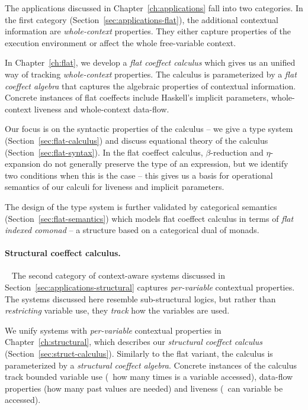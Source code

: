 The applications discussed in Chapter~\ref{ch:applications} fall into two categories. In the first
category (Section~\ref{sec:applications-flat}), the additional contextual information are 
\emph{whole-context} properties. They either capture properties of the execution environment or
affect the whole free-variable context.

In Chapter~\ref{ch:flat}, we develop a \emph{flat coeffect calculus} which gives us an unified way
of tracking \emph{whole-context} properties. The calculus is parameterized by a \emph{flat coeffect
algebra} that captures the algebraic properties of contextual information. Concrete 
instances of flat coeffects include Haskell's implicit parameters, whole-context liveness and
whole-context data-flow. 

Our focus is on the syntactic properties of the calculus -- we give a type system 
(Section~\ref{sec:flat-calculus}) and discuss equational theory of the calculus (Section~\ref{sec:flat-syntax}).
In the flat coeffect calculus, $\beta$-reduction and $\eta$-expansion do not generally preserve
the type of an expression, but we identify two conditions when this is the case -- this gives us
a basis for operational semantics of our calculi for liveness and implicit parameters. 

The design of the type system is further validated by categorical semantics
(Section~\ref{sec:flat-semantics}) which models flat coeffect calculus in terms of 
\emph{flat indexed comonad} -- a structure based on a categorical dual of monads.


\paragraph{Structural coeffect calculus.}

~ The second category of context-aware systems discussed in Section~\ref{sec:applications-structural}
captures \emph{per-variable} contextual properties. The systems discussed here resemble sub-structural
logics, but rather than \emph{restricting} variable use, they \emph{track} how the variables are used.

We unify systems with \emph{per-variable} contextual properties in Chapter~\ref{ch:structural},
which describes our \emph{structural coeffect calculus} (Section~\ref{sec:struct-calculus}). 
Similarly to the flat variant, the calculus is parameterized by a \emph{structural coeffect algebra}. 
Concrete instances of the calculus track bounded variable use (\ie~how many times is a variable 
accessed), data-flow properties (how many past values are needed) and liveness (\ie~can variable 
be accessed). 

